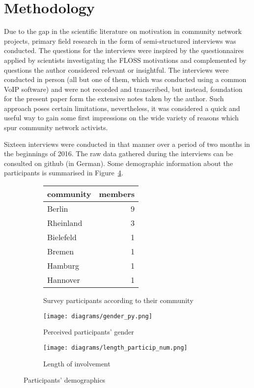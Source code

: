 \section{Methodology}

Due to the gap in the scientific literature on motivation in community network projects, primary field research in the form of semi-structured interviews was conducted.
The questions for the interviews were inspired by the questionnaires applied by scientists investigating the FLOSS motivations\cite{HarOu2002}\cite{LakWo2005} and complemented by questions the author considered relevant or insightful.
The interviews were conducted in person (all but one of them, which was conducted using a common VoIP software) and were not recorded and transcribed, but instead, foundation for the present paper form the extensive notes taken by the author.
Such approach poses certain limitations, nevertheless, it was considered a quick and useful way to gain some first impressions on the wide variety of reasons which spur community network activists.

Sixteen interviews were conducted in that manner over a period of two months in the beginnings of 2016.
The raw data gathered during the interviews can be consulted on github\cite{FFInterviews} (in German).
Some demographic information about the participants is summarised in Figure~\ref{fig:demography}.

\begin{figure}[h]
  \begin{subfigure}[h]{\textwidth}
    \centering
    \begin{tabular}{ l | r }
      \hline
      \textbf{community} & \textbf{members}\\
      \hline
      Berlin & 9 \\
      Rheinland & 3 \\
      Bielefeld & 1 \\
      Bremen & 1 \\
      Hamburg & 1 \\
      Hannover & 1 \\
      \hline
    \end{tabular}
  \caption{Survey participants according to their community}
  \label{tab:communities}
  \end{subfigure}
  \qquad
  \begin{subfigure}[h]{0.45\textwidth}
    \texttt{[image: diagrams/gender\_py.png]}
    \caption{Perceived participants' gender}
    \label{fig:gender}
  \end{subfigure}
  \qquad
  \begin{subfigure}[h]{0.45\textwidth}
    \centering
    \texttt{[image: diagrams/length\_particip\_num.png]}
    \caption{Length of involvement}
    \label{fig:length}
  \end{subfigure}
  \caption{Participants' demographics}
  \label{fig:demography}
\end{figure}

